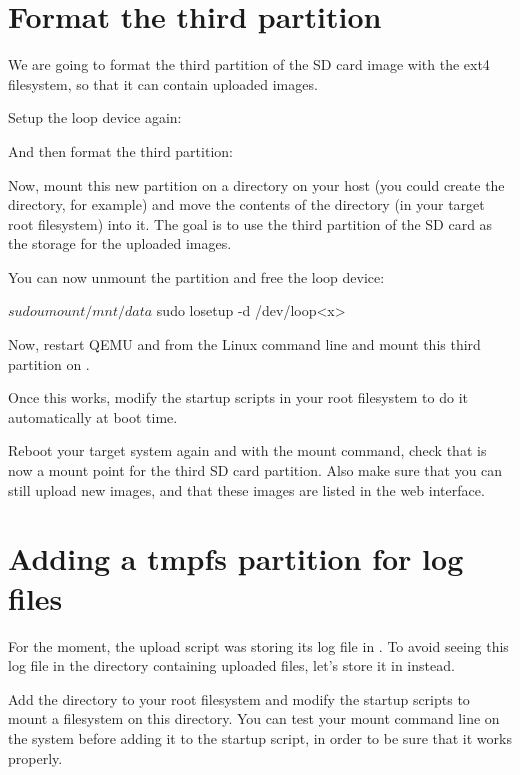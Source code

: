 \section{Format the third partition}

We are going to format the third partition of the SD card image
with the ext4 filesystem, so that it can contain uploaded images.

Setup the loop device again:

And then format the third partition:


Now, mount this new partition on a directory on your host (you could
create the  directory, for example) and move the contents of the
 directory (in your target root filesystem) into
it. The goal is to use the third partition of the SD card as the storage
for the uploaded images.

You can now unmount the partition and free the loop device:
\begin{bashinput}
$ sudo umount /mnt/data
$ sudo losetup -d /dev/loop<x>
\end{bashinput}

Now, restart QEMU and from the Linux command line and
mount this third partition on .

Once this works, modify the startup scripts in your root filesystem
to do it automatically at boot time.

Reboot your target system again and with the mount command, check that
 is now a mount point for the third SD card
partition. Also make sure that you can still upload new images, and
that these images are listed in the web interface.

\section{Adding a tmpfs partition for log files}

For the moment, the upload script was storing its log file in
. To avoid seeing this log file in
the directory containing uploaded files, let's store it in
 instead.

Add the  directory to your root filesystem and modify
the startup scripts to mount a  filesystem on this
directory. You can test your  mount command line on the
system before adding it to the startup script, in order to be sure
that it works properly.

